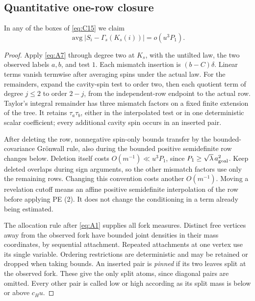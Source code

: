 \subsection{Quantitative one-row closure}


\begin{proposition}\label{bud:closure}

In any of the boxes of \eqref{eq:C15} we claim
\[
 \operatorname{avg}|S_i-\Gamma_s(K_s(i))|=o(u^3 P_1).                     \tag{C19}\label{eq:C19}
\]

\end{proposition}\begin{proof}

Apply \eqref{eq:A7} through degree two at \(K_s\), with the
untilted law, the two observed labels \(a,b\), and test \(1\).
Each mismatch insertion is \((b-C)\delta\). Linear terms vanish
termwise after averaging spins under the actual law.
For the remainders, expand the cavity-spin test to order two, then each
quotient term of degree \(j\le2\) to order \(2-j\), from the
independent-row endpoint to the actual row. Taylor's integral remainder
has three mismatch factors on a fixed finite extension of the tree.
It retains \(\tau_a\tau_b\), either in the interpolated test or in
one deterministic scalar coefficient; every additional cavity spin
occurs in an inserted pair.

After deleting the row, nonnegative spin-only bounds transfer by the
bounded-covariance Gr\"onwall rule, also during the bounded positive
semidefinite row changes below. Deletion itself costs
\(O(m^{-1})\ll u^3P_1\), since
\(P_1\ge\sqrt\lambda\,a_{\rm goal}^2\).
Keep deleted overlaps during sign arguments, so the other mismatch
factors use only the remaining rows. Changing this convention costs
another \(O(m^{-1})\). Moving a revelation cutoff means an affine
positive semidefinite interpolation of the row before applying PE (2).
It does not change the conditioning in a term already being estimated.

The allocation rule after \eqref{eq:A1} supplies all fork measures.
Distinct free vertices away from the observed fork have bounded joint
densities in their mass coordinates, by sequential attachment.
Repeated attachments at one vertex use its single variable.
Ordering restrictions are deterministic and may be retained or dropped
when taking bounds. An inserted pair is \emph{pinned} if its two leaves
split at the observed fork. These give the only split atoms, since
diagonal pairs are omitted. Every other pair is called low or high
according as its split mass is below or above \(c_Hu\).


\end{proof}
